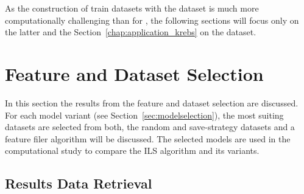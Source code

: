 \parbreak

As the construction of train datasets with the \krebsADataSetText dataset is much more computationally challenging than for \gendreauDataSet,
the following sections will focus only on the latter and the Section~\ref{chap:application_krebs} on the \krebsADataSetText dataset.

\section{Feature and Dataset Selection}
\label{sec:ResultsTraining}
In this section the results from the feature and dataset selection are discussed. For each model variant (see Section~\ref{sec:modelselection}),
the most suiting datasets are selected from both, the random and save-strategy datasets and
a feature filer algorithm will be discussed. The selected models are used in the computational study to compare the \gls{ILS} algorithm
and its variants.

\subsection{Results Data Retrieval}
\label{subsec:results_retrieval}


